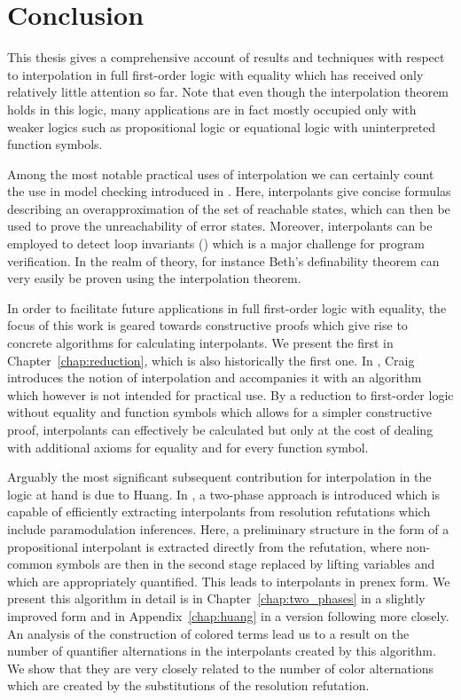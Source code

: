 \chapter{Conclusion}

This thesis gives a comprehensive account of results and techniques with respect to interpolation in full first-order logic with equality which has received only relatively little attention so far. 
Note that even though the interpolation theorem holds in this logic, %
many applications are in fact mostly occupied only with weaker logics such as propositional logic or equational logic with uninterpreted function symbols.

Among the most notable practical uses of interpolation we can certainly count the use in model checking introduced in \cite{McMillan03}.
Here, interpolants give concise formulas describing an overapproximation of the set of reachable states, which can then be used to prove the unreachability of error states.
Moreover, interpolants can be employed to detect loop invariants (\cite{weissenbacher2010}) which is a major challenge for program verification.
In the realm of theory, for instance Beth's definability theorem can very easily be proven using the interpolation theorem.

In order to facilitate future applications in full first-order logic with equality, the focus of this work is geared towards constructive proofs which give rise to concrete algorithms for calculating interpolants.
We present the first in Chapter~\ref{chap:reduction}, which is also historically the first one.
In \cite{Craig57linear,Craig57three}, Craig introduces the notion of interpolation and accompanies it with an algorithm which however is not intended for practical use.
By a reduction to first-order logic without equality and function symbols which allows for a simpler constructive proof, interpolants can effectively be calculated but only at the cost of dealing with additional axioms for equality and for every function symbol.

Arguably the most significant subsequent contribution for interpolation in the logic at hand is due to Huang.
In \cite{Huang95}, a two-phase approach is introduced which is capable of efficiently extracting interpolants from resolution refutations which include paramodulation inferences.
Here, a preliminary structure in the form of a propositional interpolant is extracted directly from the refutation, where non-common symbols are then in the second stage replaced by lifting variables and which are appropriately quantified.
This leads to interpolants in prenex form.
We present this algorithm in detail is in Chapter~\ref{chap:two_phases} in a slightly improved form and in Appendix~\ref{chap:huang} in a version following \cite{Huang95} more closely. 
An analysis of the construction of colored terms lead us to a result on the number of quantifier alternations in the interpolants created by this algorithm. We show that they are very closely related to the number of color alternations which are created by the substitutions of the resolution refutation. 


